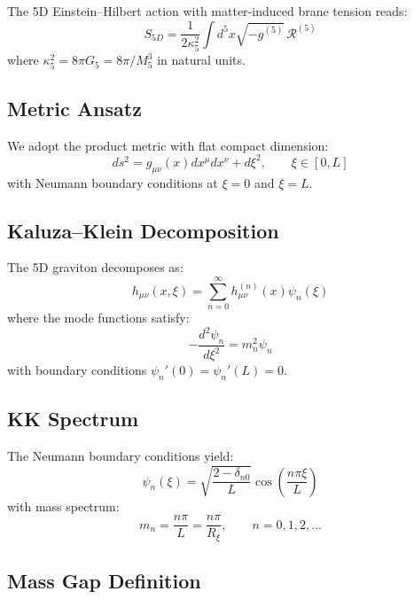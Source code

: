 \documentclass[11pt,a4paper]{article}
\newcommand{\Mfive}{M_5}
\newcommand{\Rxi}{R_\xi}
\theoremstyle{definition}
\theoremstyle{plain}
\theoremstyle{remark}
\begin{document}
The 5D Einstein--Hilbert action with matter-induced brane tension reads:
\begin{equation}
S_{5D} = \frac{1}{2\kappa_5^2} \int d^5x \sqrt{-g^{(5)}} \, \mathcal{R}^{(5)}
\label{eq:5d-action}
\end{equation}
where $\kappa_5^2 = 8\pi G_5 = 8\pi/\Mfive^3$ in natural units.

\subsection{Metric Ansatz}

We adopt the product metric with flat compact dimension:
\begin{equation}
ds^2 = g_{\mu\nu}(x) dx^\mu dx^\nu + d\xi^2, \qquad \xi \in [0, L]
\label{eq:metric-ansatz}
\end{equation}
with Neumann boundary conditions at $\xi = 0$ and $\xi = L$.

\subsection{Kaluza--Klein Decomposition}

The 5D graviton decomposes as:
\begin{equation}
h_{\mu\nu}(x,\xi) = \sum_{n=0}^{\infty} h_{\mu\nu}^{(n)}(x) \psi_n(\xi)
\label{eq:kk-decomposition}
\end{equation}
where the mode functions satisfy:
\begin{equation}
-\frac{d^2\psi_n}{d\xi^2} = m_n^2 \psi_n
\label{eq:mode-equation}
\end{equation}
with boundary conditions $\psi_n'(0) = \psi_n'(L) = 0$.

\subsection{KK Spectrum}

The Neumann boundary conditions yield:
\begin{equation}
\psi_n(\xi) = \sqrt{\frac{2-\delta_{n0}}{L}} \cos\left(\frac{n\pi\xi}{L}\right)
\label{eq:mode-functions}
\end{equation}
with mass spectrum:
\begin{equation}
\boxed{m_n = \frac{n\pi}{L} = \frac{n\pi}{\Rxi}, \qquad n = 0, 1, 2, \ldots}
\label{eq:kk-spectrum}
\end{equation}

\subsection{Mass Gap Definition}
\end{document}

